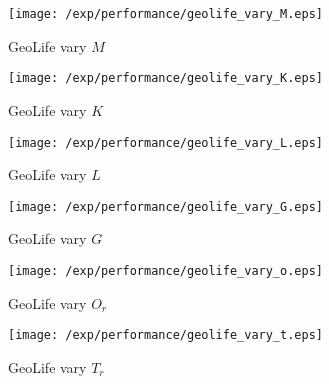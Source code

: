 \begin{figure*}[t]
	\begin{subfigure}[b]{0.16\textwidth}
        \texttt{[image: /exp/performance/geolife\_vary\_M.eps]}
        \caption{GeoLife vary $M$}
    \end{subfigure}
    \begin{subfigure}[b]{0.16\textwidth}
        \texttt{[image: /exp/performance/geolife\_vary\_K.eps]}
        \caption{GeoLife vary $K$}
    \end{subfigure}
    \begin{subfigure}[b]{0.16\textwidth}
        \texttt{[image: /exp/performance/geolife\_vary\_L.eps]}
        \caption{GeoLife vary $L$}
    \end{subfigure}
       \begin{subfigure}[b]{0.16\textwidth}
        \texttt{[image: /exp/performance/geolife\_vary\_G.eps]}
        \caption{GeoLife vary $G$}
    \end{subfigure}       
 	 \begin{subfigure}[b]{0.16\textwidth}
        \texttt{[image: /exp/performance/geolife\_vary\_o.eps]}
        \caption{GeoLife vary $O_r$}
    \end{subfigure}
 	\begin{subfigure}[b]{0.16\textwidth}
        \texttt{[image: /exp/performance/geolife\_vary\_t.eps]}
        \caption{GeoLife vary $T_r$}
    \end{subfigure}    
    

\end{figure*}
